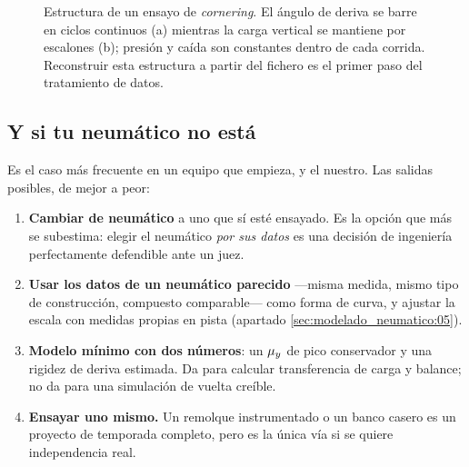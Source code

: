 \begin{figure}[htbp]
\centering
{}%
\hfill
{}
\caption[Estructura de un ensayo de neumático]{Estructura de un ensayo de
\emph{cornering}. El ángulo de deriva se barre en ciclos continuos (a) mientras
la carga vertical se mantiene por escalones (b); presión y caída son constantes
dentro de cada corrida. Reconstruir esta estructura a partir del fichero es el
primer paso del tratamiento de datos.}
\label{fig:modelado:ensayo}
\end{figure}

\subsection{Y si tu neumático no está}

Es el caso más frecuente en un equipo que empieza, y el nuestro. Las salidas
posibles, de mejor a peor:

\begin{enumerate}
  \item \textbf{Cambiar de neumático} a uno que sí esté ensayado. Es la opción
        que más se subestima: elegir el neumático \emph{por sus datos} es una
        decisión de ingeniería perfectamente defendible ante un juez.
  \item \textbf{Usar los datos de un neumático parecido} ---misma medida, mismo
        tipo de construcción, compuesto comparable--- como forma de curva, y
        ajustar la escala con medidas propias en pista (apartado
        \ref{sec:modelado_neumatico:05}).
  \item \textbf{Modelo mínimo con dos números}: un $\mu_y$ de pico conservador y
        una rigidez de deriva estimada. Da para calcular transferencia de carga
        y balance; no da para una simulación de vuelta creíble.
  \item \textbf{Ensayar uno mismo.} Un remolque instrumentado o un banco casero
        es un proyecto de temporada completo, pero es la única vía si se quiere
        independencia real.
\end{enumerate}

